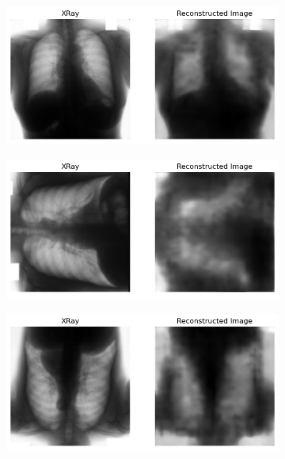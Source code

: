   \begin{figure}[htbp]
    \centering
    \begin{subfigure}{0.49\linewidth}
        \centering
        \includegraphics[width=\linewidth]{../plots/unsupervised-orientation/result-up.png}
        \caption{ }
        \label{fig:unsup-orientation-up}
    \end{subfigure}
    \begin{subfigure}{0.49\linewidth}
        \centering
        \includegraphics[width=\linewidth]{../plots/unsupervised-orientation/result-right.png}
        \caption{ }
        \label{fig:unsup-orienation-right}
    \end{subfigure}
    \begin{subfigure}{0.49\linewidth}
        \centering
        \includegraphics[width=\linewidth]{../plots/unsupervised-orientation/result-down.png}

\end{subfigure}
\end{figure}
